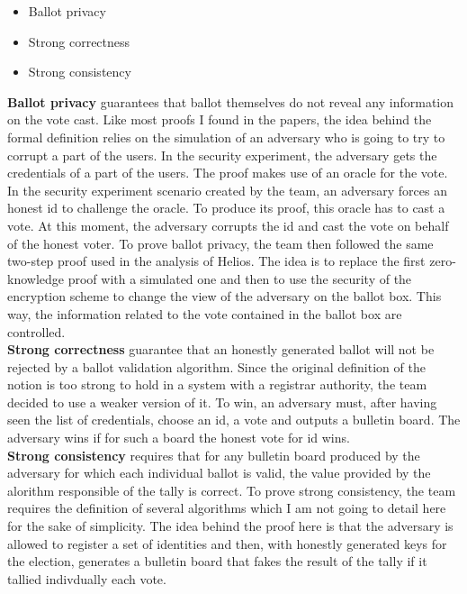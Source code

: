 \documentclass[12pt, a4paper]{report}
\begin{document}
\begin{itemize}
\item Ballot privacy
\item Strong correctness
\item Strong consistency
\end{itemize}

\textbf{Ballot privacy} guarantees that ballot themselves do not reveal any information on the vote cast. Like most proofs I found in the papers, the idea behind the formal definition relies on the simulation of an adversary who is going to try to corrupt a part of the users. In the security experiment, the adversary gets the credentials of a part of the users. The proof makes use of an oracle for the vote. In the security experiment scenario created by the team, an adversary forces an honest id to challenge the oracle. To produce its proof, this oracle has to cast a vote. At this moment, the adversary corrupts the id and cast the vote on behalf of the honest voter. To prove ballot privacy, the team then followed the same two-step proof used in the analysis of Helios. The idea is to replace the first zero-knowledge proof with a simulated one and then to use the security of the encryption scheme to change the view of the adversary on the ballot box. This way, the information related to the vote contained in the ballot box are controlled.\cite{BOOK:2} \\

\textbf{Strong correctness} guarantee that an honestly generated ballot will not be rejected by a ballot validation algorithm. Since the original definition of the notion is too strong to hold in a system with a registrar authority, the team decided to use a weaker version of it. To win, an adversary must, after having seen the list of credentials, choose an id, a vote and outputs a bulletin board. The adversary wins if for such a board the honest vote for id wins.\cite{BOOK:2} \\

\textbf{Strong consistency} requires that for any bulletin board produced by the adversary for which each individual ballot is valid, the value provided by the alorithm responsible of the tally is correct. To prove strong consistency, the team requires the definition of several algorithms which I am not going to detail here for the sake of simplicity. The idea behind the proof here is that the adversary is allowed to register a set of identities and then, with honestly generated keys for the election, generates a bulletin board that fakes the result of the tally if it tallied indivdually each vote.\cite{BOOK:2} \\
\end{document}
